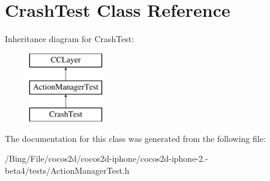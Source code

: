 \hypertarget{interface_crash_test}{\section{Crash\-Test Class Reference}
\label{interface_crash_test}
}
Inheritance diagram for Crash\-Test\-:\begin{figure}[H]
\begin{center}
\leavevmode
\includegraphics[height=3.000000cm]{interface_crash_test}
\end{center}
\end{figure}


The documentation for this class was generated from the following file\-:\begin{DoxyCompactItemize}
\item 
/\-Bing/\-File/cocos2d/cocos2d-\/iphone/cocos2d-\/iphone-\/2.-\/beta4/tests/Action\-Manager\-Test.\-h\end{DoxyCompactItemize}
